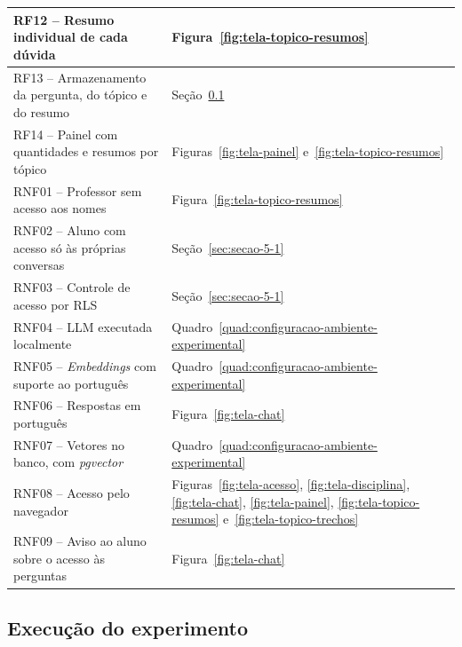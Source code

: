 \begin{quadro}[H]
\begin{tabularx}{\textwidth}{
|>{\raggedright\arraybackslash}X
|>{\raggedright\arraybackslash}X|
}
RF12 -- Resumo individual de cada dúvida &
Figura~\ref{fig:tela-topico-resumos} \\ \hline

RF13 -- Armazenamento da pergunta, do tópico e do resumo &
Seção~\ref{sec:secao-5-2} \\ \hline

RF14 -- Painel com quantidades e resumos por tópico &
Figuras~\ref{fig:tela-painel} e~\ref{fig:tela-topico-resumos} \\ \hline

RNF01 -- Professor sem acesso aos nomes &
Figura~\ref{fig:tela-topico-resumos} \\ \hline

RNF02 -- Aluno com acesso só às próprias conversas &
Seção~\ref{sec:secao-5-1} \\ \hline

RNF03 -- Controle de acesso por RLS &
Seção~\ref{sec:secao-5-1} \\ \hline

RNF04 -- LLM executada localmente &
Quadro~\ref{quad:configuracao-ambiente-experimental} \\ \hline

RNF05 -- \textit{Embeddings} com suporte ao português &
Quadro~\ref{quad:configuracao-ambiente-experimental} \\ \hline

RNF06 -- Respostas em português &
Figura~\ref{fig:tela-chat} \\ \hline

RNF07 -- Vetores no banco, com \textit{pgvector} &
Quadro~\ref{quad:configuracao-ambiente-experimental} \\ \hline

RNF08 -- Acesso pelo navegador &
Figuras~\ref{fig:tela-acesso},
\ref{fig:tela-disciplina},
\ref{fig:tela-chat},
\ref{fig:tela-painel},
\ref{fig:tela-topico-resumos} e~\ref{fig:tela-topico-trechos} \\ \hline

RNF09 -- Aviso ao aluno sobre o acesso às perguntas &
Figura~\ref{fig:tela-chat}\, \\ \hline

\end{tabularx}
{\fontsize{10pt}{12pt}\selectfont
\caption*{Fonte: Elaborado pela autora (2026).} %
}
\end{quadro}

\FloatBarrier

\subsection{{\fontsize{12pt}{14pt}\selectfont Execução do experimento}}
\label{sec:secao-5-2}

